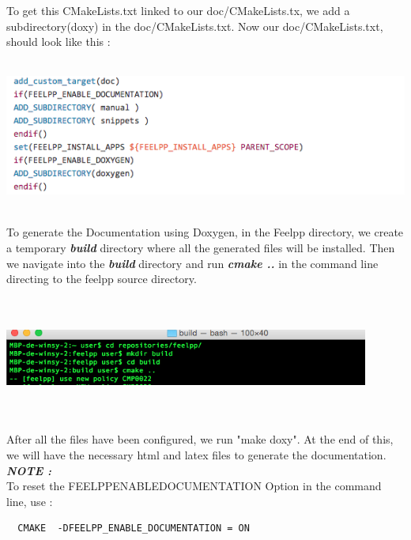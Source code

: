\documentclass[11pt,utf8]{article}
\begin{document}
To get this CMakeLists.txt linked to our doc/CMakeLists.tx, we  add a subdirectory(doxy) in the doc/CMakeLists.txt. Now our  doc/CMakeLists.txt, should look like this :

 \begin{center}
 \includegraphics[width=15cm,height=5cm]{im2}
 \end{center}
 

 To generate the Documentation using Doxygen, in the Feelpp directory, we create a temporary \textbf{\textit{build}} directory where all the generated files will be installed. Then we navigate into the  \textbf{\textit{build}} directory and run  \textbf{\textit{cmake ..}} in the command line directing to the feelpp source directory. 
 
 \begin{center}
 \includegraphics[width=12cm,height=4cm]{img}
 \end{center}
 
 After all the files have been configured, we run "make doxy". At the end of this, we will have the necessary html and latex files to generate the documentation.\\
 \textbf{\textit{NOTE :}}\\
 To reset the  FEELPP\textunderscore ENABLE\textunderscore DOCUMENTATION Option in the command line, use :
 
 \begin{center}
 \begin{lstlisting}
  CMAKE  -DFEELPP_ENABLE_DOCUMENTATION = ON
 \end{lstlisting}
 \end{center}
 
\end{document}
